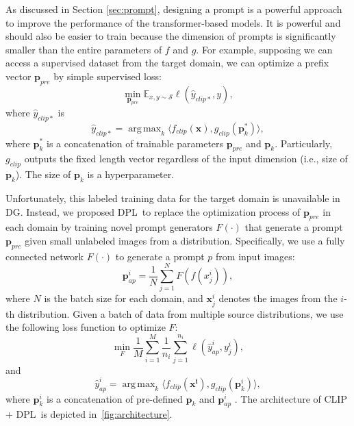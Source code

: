 \documentclass[letterpaper]{article} \usepackage[]{aaai23}
\DeclareMathOperator*{\argmax}{arg\,max}
\newcommand{\dplshort}{DPL}
\begin{document}
As discussed in Section \ref{sec:prompt}, designing a prompt is a powerful approach to improve the performance of the transformer-based models. 
It is powerful and should also be easier to train because the dimension of prompts is significantly smaller than the entire parameters of $f$ and $g$. 
For example, supposing we can access a supervised dataset from the target domain, we can optimize a prefix vector $\bm{p}_{pre}$ by simple supervised loss: 
\begin{equation}
\min_{\bm{p}_{pre}} \mathbb{E}_{x, y \sim \mathcal{S}} \ell(\hat{y}_{clip*}, y), 
\end{equation}
where $\hat{y}_{clip*}$ is 
\begin{equation}
    \hat{y}_{clip*} = \argmax_{k}\langle f_{clip}(\bm{x}), g_{clip}(\bm{p}_k^{*})\rangle,
\end{equation}
where $\bm{p}_k^{*}$ is a concatenation of trainable parameters $\bm{p}_{pre}$ and $\bm{p}_{k}$. 
Particularly, $g_{clip}$ outputs the fixed length vector regardless of the input dimension (i.e., size of $\bm{p}_{k}$). 
The size of $\bm{p}_{k}$ is a hyperparameter. 


Unfortunately, this labeled training data for the target domain is unavailable in DG. 
Instead, we proposed \dplshort~to replace the optimization process of $\bm{p}_{pre}$ in each domain by training novel prompt generators $F(\cdot)$ that generate a prompt $\bm{p}_{pre}$ given small unlabeled images from a distribution. 
Specifically, we use a fully connected network $F(\cdot)$ to generate a prompt $p$ from input images: 
\begin{equation}
    \bm{p}_{ap}^{i} = \frac{1}{N} \sum_{j = 1}^{N}F(f(x_{j}^{i})), 
\end{equation}
where $N$ is the batch size for each domain, and $\bm{x}_{j}^{i}$ denotes the images from the $i$-th distribution. 
Given a batch of data from multiple source distributions, we use the following loss function to optimize $F$:
\begin{equation}
\min_{F} \frac{1}{M}\sum_{i=1}^{M}\frac{1}{n_i}\sum_{j=1}^{n_i}\ell(\hat{y}_{ap}^i, y_j^i),
\end{equation}
and 
\begin{equation}
    \hat{y}_{ap}^i = \argmax_{k}\langle f_{clip}(\bm{x^i}), g_{clip}(\bm{p}_k^{i})\rangle,
\end{equation}
where  $\bm{p}_k^{i}$ is a concatenation of pre-defined $\bm{p}_k$ and $\bm{p}_{ap}^i$ . 
The architecture of CLIP + \dplshort~is depicted in~\autoref{fig:architecture}.
\end{document}
